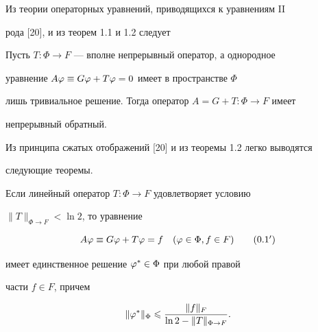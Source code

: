 Из теории операторных уравнений, приводящихся к уравнениям II


рода [20], и из теорем 1.1 и 1.2 следует





\begin{thms}


Пусть $T:\Phi\to F$ --- вполне непрерывный оператор, а однородное 


уравнение $A\varphi\equiv G\varphi + T\varphi =0$ имеет в пространстве $\Phi$ 


лишь тривиальное решение. Тогда оператор $A=G+T:\Phi\to F$ имеет 


непрерывный обратный.


\end{thms}





Из принципа сжатых отображений [20] и из теоремы 1.2 легко выводятся 


следующие теоремы.





\begin{thms}


Если линейный оператор $T:\Phi\to F$ удовлетворяет условию


$\|T\|_{\Phi\to F}< \ln 2$, то уравнение 


\begin{equation}


A\vp\equiv G\vp+T\vp = f\quad (\vp \in \Phi, f\in F)


\tag{$0.1'$}


\end{equation} 


имеет единственное решение $\varphi^*\in \Phi$ при любой правой 


части $f \in F$, причем 


$$


\|\vp^*\|_\Phi \lea \frac{\|f\|_F}{\ln 2 - \|T\|_{\Phi\to F}}.


$$


\end{thms}





